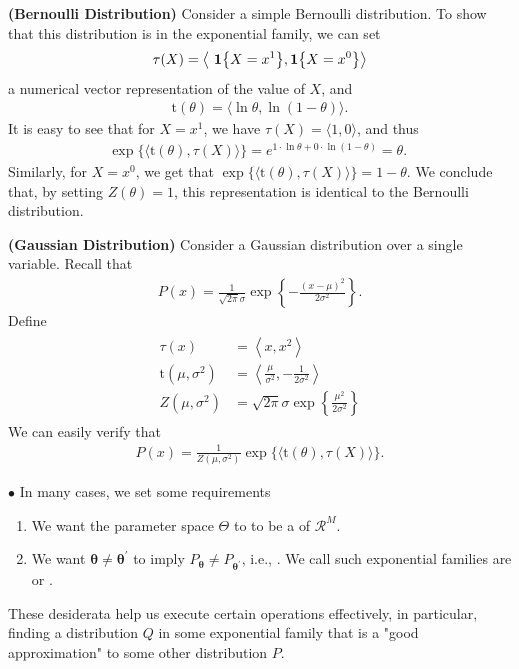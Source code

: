 \documentclass{article}
\newcommand{\bfs}[1]{\textbf{({#1}) }}
\begin{document}
\begin{exma}\bfs{Bernoulli Distribution}\label{ex:dfafdyrq}
Consider a simple Bernoulli distribution. To show that this distribution is in the exponential family, we can set
\begin{align*}
\tau(X)=\left\langle\ \indicate{X=x^{1}}, \indicate{X=x^{0}}\right\rangle
\end{align*}
a numerical vector representation of the value of $X$, and
\begin{align*}
\mathrm{t}(\theta)=\langle\ln \theta, \ln (1-\theta)\rangle .
\end{align*}
It is easy to see that for $X=x^{1}$, we have $\tau(X)=\langle 1,0\rangle$, and thus
\begin{align*}
\exp \{\langle\mathrm{t}(\theta), \tau(X)\rangle\}=e^{1 \cdot \ln \theta+0 \cdot \ln (1-\theta)}=\theta \text {. }
\end{align*}
Similarly, for $X=x^{0}$, we get that $\exp \{\langle\mathrm{t}(\theta), \tau(X)\rangle\}=1-\theta$. We conclude that, by setting $Z(\theta)=1$, this representation is identical to the Bernoulli distribution.
\end{exma}
\begin{exma}\bfs{Gaussian Distribution}
Consider a Gaussian distribution over a single variable. Recall that
\begin{align*}
P(x)=\frac{1}{\sqrt{2 \pi} \sigma} \exp \left\{-\frac{(x-\mu)^{2}}{2 \sigma^{2}}\right\} .
\end{align*}
Define
\begin{align*}
\begin{aligned}
\tau(x) &=\left\langle x, x^{2}\right\rangle \\
\mathrm{t}\left(\mu, \sigma^{2}\right) &=\left\langle\frac{\mu}{\sigma^{2}},-\frac{1}{2 \sigma^{2}}\right\rangle \\
Z\left(\mu, \sigma^{2}\right) &=\sqrt{2 \pi} \sigma \exp \left\{\frac{\mu^{2}}{2 \sigma^{2}}\right\}
\end{aligned}
\end{align*}
We can easily verify that
\begin{align*}
P(x)=\frac{1}{Z\left(\mu, \sigma^{2}\right)} \exp \{\langle\mathrm{t}(\theta), \tau(X)\rangle\} .
\end{align*}
\end{exma}
$\bullet$ In many cases, we set some requirements
\begin{enumerate}
    \item We want the parameter space $\Theta$ to to be a  of $\mathcal{R}^{M}$. 
    \item We want $\boldsymbol{\theta} \neq \boldsymbol{\theta}^{\prime}$ to imply $P_{\boldsymbol{\theta}} \neq P_{\boldsymbol{\theta}^{\prime}}$, i.e., .  We call such exponential families are  or . 
\end{enumerate}
These desiderata help us execute certain operations effectively, in particular, finding a distribution $Q$ in some exponential family that is a "good approximation" to some other distribution $P$.
\end{document}
